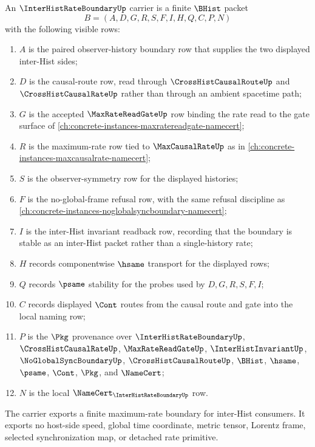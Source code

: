 \begin{definition}
\label{def:inter-hist-rate-boundary-carrier}
An $\InterHistRateBoundaryUp$ carrier is a finite $\BHist$ packet
$$
B=(A,D,G,R,S,F,I,H,Q,C,P,N)
$$
with the following visible rows:
\begin{enumerate}
\item $A$ is the paired observer-history boundary row that supplies the two displayed inter-Hist sides;
\item $D$ is the causal-route row, read through $\CrossHistCausalRouteUp$ and $\CrossHistCausalRateUp$ rather than through an ambient spacetime path;
\item $G$ is the accepted $\MaxRateReadGateUp$ row binding the rate read to the gate surface of \autoref{ch:concrete-instances-maxratereadgate-namecert};
\item $R$ is the maximum-rate row tied to $\MaxCausalRateUp$ as in \autoref{ch:concrete-instances-maxcausalrate-namecert};
\item $S$ is the observer-symmetry row for the displayed histories;
\item $F$ is the no-global-frame refusal row, with the same refusal discipline as \autoref{ch:concrete-instances-noglobalsyncboundary-namecert};
\item $I$ is the inter-Hist invariant readback row, recording that the boundary is stable as an inter-Hist packet rather than a single-history rate;
\item $H$ records componentwise $\hsame$ transport for the displayed rows;
\item $Q$ records $\psame$ stability for the probes used by $D,G,R,S,F,I$;
\item $C$ records displayed $\Cont$ routes from the causal route and gate into the local naming row;
\item $P$ is the $\Pkg$ provenance over $\InterHistRateBoundaryUp$, $\CrossHistCausalRateUp$, $\MaxRateReadGateUp$, $\InterHistInvariantUp$, $\NoGlobalSyncBoundaryUp$, $\CrossHistCausalRouteUp$, $\BHist$, $\hsame$, $\psame$, $\Cont$, $\Pkg$, and $\NameCert$;
\item $N$ is the local $\NameCert_{\InterHistRateBoundaryUp}$ row.
\end{enumerate}
The carrier exports a finite maximum-rate boundary for inter-Hist consumers. It exports no host-side speed, global time coordinate, metric tensor, Lorentz frame, selected synchronization map, or detached rate primitive.
\end{definition}

